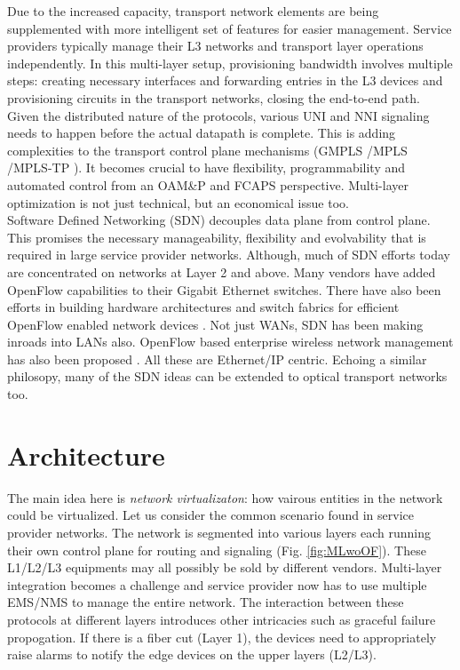 \documentclass{sig-alternate-10pt}
\begin{document}
	Due to the increased capacity, transport network elements are being supplemented with more intelligent
	set of features for easier management. Service providers typically manage their L3 networks and transport
	layer operations independently. In this multi-layer setup, provisioning bandwidth involves multiple
	steps: creating necessary interfaces and forwarding entries in the L3 devices and provisioning circuits
	in the transport networks, closing the end-to-end path. Given the distributed nature of the protocols,
	various UNI and NNI signaling needs to happen before the actual datapath is complete. This is adding
	complexities to the transport control plane mechanisms (GMPLS \cite{gmpls}/MPLS \cite{mpls}/MPLS-TP
	\cite{mpls-tp}). It becomes crucial to have flexibility, programmability and automated control from an
	OAM\&P and FCAPS perspective. Multi-layer optimization is not just technical, but an economical issue
	too. \\
		
	Software Defined Networking (SDN) decouples data plane from control plane. This promises the necessary
	manageability, flexibility and evolvability that is required in large service provider networks.
	Although, much of SDN efforts today are concentrated on networks at Layer 2 and above. Many vendors have
	added OpenFlow capabilities to their Gigabit Ethernet switches. There have also been efforts in building
	hardware architectures \cite{Mogul2012} and switch fabrics for efficient OpenFlow enabled network devices
	\cite{Casado2012}. Not just WANs, SDN has been making inroads into LANs also. OpenFlow based enterprise
	wireless network management has also been proposed \cite{Suresh2012}. All these are Ethernet/IP centric.
	Echoing a similar philosopy, many of the SDN ideas can be extended to optical transport networks too.

\section{Architecture}
\label{sec:arch}
		
	The main idea here is \emph{network virtualizaton}: how vairous entities in the network could be virtualized.
	Let us consider the common scenario found in service provider networks. The network is segmented into
	various layers each running their own control plane for routing and signaling (Fig. \ref{fig:MLwoOF}).
	These L1/L2/L3 equipments may all possibly be sold by different vendors. Multi-layer integration becomes
	a challenge and service provider now has to use multiple EMS/NMS to manage the entire network. The
	interaction between these protocols at different layers introduces other intricacies such as graceful
	failure propogation. If there is a fiber cut (Layer 1), the devices need to appropriately raise alarms to
	notify the edge devices on the upper layers (L2/L3). \\
\end{document}
